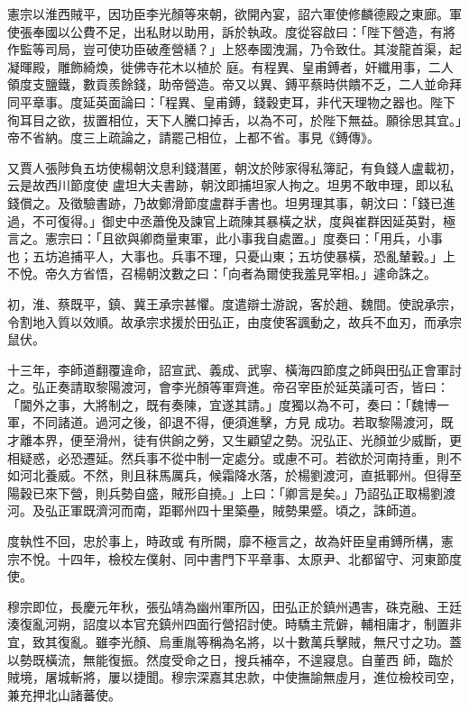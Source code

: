 \begin{pinyinscope}
 憲宗以淮西賊平，因功臣李光顏等來朝，欲開內宴，詔六軍使修麟德殿之東廊。軍使張奉國以公費不足，出私財以助用，訴於執政。度從容啟曰：「陛下營造，有將作監等司局，豈可使功臣破產營繕？」上怒奉國洩漏，乃令致仕。其浚龍首渠，起凝暉殿，雕飾綺煥，徙佛寺花木以植於
 庭。有程異、皇甫鎛者，奸纖用事，二人領度支鹽鐵，數貢羨餘錢，助帝營造。帝又以異、鎛平蔡時供饋不乏，二人並命拜同平章事。度延英面論曰：「程異、皇甫鎛，錢穀吏耳，非代天理物之器也。陛下徇耳目之欲，拔置相位，天下人騰口掉舌，以為不可，於陛下無益。願徐思其宜。」帝不省納。度三上疏論之，請罷己相位，上都不省。事見《鎛傳》。



 又賈人張陟負五坊使楊朝汶息利錢潛匿，朝汶於陟家得私簿記，有負錢人盧載初，云是故西川節度使
 盧坦大夫書跡，朝汶即捕坦家人拘之。坦男不敢申理，即以私錢償之。及徵驗書跡，乃故鄭滑節度盧群手書也。坦男理其事，朝汶曰：「錢已進過，不可復得。」御史中丞蕭俛及諫官上疏陳其暴橫之狀，度與崔群因延英對，極言之。憲宗曰：「且欲與卿商量東軍，此小事我自處置。」度奏曰：「用兵，小事也；五坊追捕平人，大事也。兵事不理，只憂山東；五坊使暴橫，恐亂輦轂。」上不悅。帝久方省悟，召楊朝汶數之曰：「向者為爾使我羞見宰相。」遽命誅之。



 初，淮、蔡既平，鎮、冀王承宗甚懼。度遣辯士游說，客於趙、魏間。使說承宗，令割地入質以效順。故承宗求援於田弘正，由度使客諷動之，故兵不血刃，而承宗鼠伏。



 十三年，李師道翻覆違命，詔宣武、義成、武寧、橫海四節度之師與田弘正會軍討之。弘正奏請取黎陽渡河，會李光顏等軍齊進。帝召宰臣於延英議可否，皆曰：「閫外之事，大將制之，既有奏陳，宜遂其請。」度獨以為不可，奏曰：「魏博一軍，不同諸道。過河之後，卻退不得，便須進擊，方見
 成功。若取黎陽渡河，既才離本界，便至滑州，徒有供餉之勞，又生顧望之勢。況弘正、光顏並少威斷，更相疑惑，必恐遷延。然兵事不從中制一定處分。或慮不可。若欲於河南持重，則不如河北養威。不然，則且秣馬厲兵，候霜降水落，於楊劉渡河，直抵鄆州。但得至陽穀已來下營，則兵勢自盛，賊形自撓。」上曰：「卿言是矣。」乃詔弘正取楊劉渡河。及弘正軍既濟河而南，距鄆州四十里築壘，賊勢果蹙。頃之，誅師道。



 度執性不回，忠於事上，時政或
 有所闕，靡不極言之，故為奸臣皇甫鎛所構，憲宗不悅。十四年，檢校左僕射、同中書門下平章事、太原尹、北都留守、河東節度使。



 穆宗即位，長慶元年秋，張弘靖為幽州軍所囚，田弘正於鎮州遇害，硃克融、王廷湊復亂河朔，詔度以本官充鎮州四面行營招討使。時驕主荒僻，輔相庸才，制置非宜，致其復亂。雖李光顏、烏重胤等稱為名將，以十數萬兵擊賊，無尺寸之功。蓋以勢既橫流，無能復振。然度受命之日，搜兵補卒，不遑寢息。自董西
 師，臨於賊境，屠城斬將，屢以捷聞。穆宗深嘉其忠款，中使撫諭無虛月，進位檢校司空，兼充押北山諸蕃使。




\end{pinyinscope}
